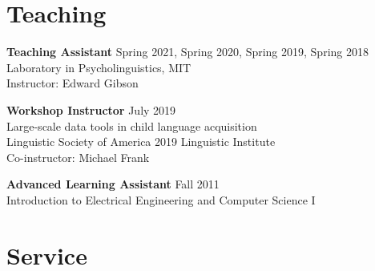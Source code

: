\documentclass[11pt,]{article}
\begin{document}
\hypertarget{teaching}{%
\section{Teaching}\label{teaching}}

\textbf{Teaching Assistant} \hfill Spring 2021, Spring 2020, Spring
2019, Spring 2018\\
\hspace*{0.333em}\hspace*{0.333em}\hspace*{0.333em}\hspace*{0.333em}Laboratory
in Psycholinguistics, MIT\\
\hspace*{0.333em}\hspace*{0.333em}\hspace*{0.333em}\hspace*{0.333em}Instructor:
Edward Gibson

\textbf{Workshop Instructor} \hfill July 2019\\
\hspace*{0.333em}\hspace*{0.333em}\hspace*{0.333em}\hspace*{0.333em}Large-scale
data tools in child language acquisition\\
\hspace*{0.333em}\hspace*{0.333em}\hspace*{0.333em}\hspace*{0.333em}Linguistic
Society of America 2019 Linguistic Institute\\
\hspace*{0.333em}\hspace*{0.333em}\hspace*{0.333em}\hspace*{0.333em}Co-instructor:
Michael Frank

\textbf{Advanced Learning Assistant} \hfill Fall 2011\\
\hspace*{0.333em}\hspace*{0.333em}\hspace*{0.333em}\hspace*{0.333em}Introduction
to Electrical Engineering and Computer Science I

\hypertarget{service}{%
\section{Service}\label{service}}
\end{document}
